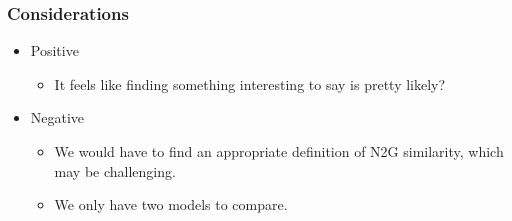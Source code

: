 \documentclass[../main.tex]{subfiles}
\begin{document}
\subsubsection{Considerations}
\begin{itemize}
    \item Positive
    \begin{itemize}
        \item It feels like finding something interesting to say is pretty likely?
    \end{itemize}
    \item Negative
    \begin{itemize}
        \item We would have to find an appropriate definition of N2G similarity, which may be challenging.
        \item We only have two models to compare.
    \end{itemize}
\end{itemize}

\end{document}
